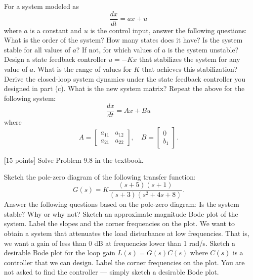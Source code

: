 \documentclass{ee122_pset}
\author{\rule{3cm}{0.4pt}} %
\begin{document}
For a system modeled as 
\[ \frac{dx}{dt} = ax + u \]
where $a$ is a constant and $u$ is the control input, answer the following questions:
\problempart [5 points] What is the order of the system? How many states does it have?
\problempart [5 points] Is the system stable for all values of $a$? If not, for which values of $a$ is the system unstable?
\problempart [10 points] Design a state feedback controller $u = -Kx$ that stabilizes the system for any value of $a$. What is the range of values for $K$ that achieves this stabilization?
\problempart [5 points] Derive the closed-loop system dynamics under the state feedback controller you designed in part (c). What is the new system matrix?
\problempart [25 points] Repeat the above for the following system:
\[ \frac{dx}{dt} = Ax + Bu \]
where
\[
A = \begin{bmatrix}
a_{11} & a_{12} \\
a_{21} & a_{22}
\end{bmatrix}, \quad B = \begin{bmatrix}    0 \\ b_1 \end{bmatrix}.
\]

 [15 points] Solve Problem 9.8 in the textbook. 

\problempart [5 points] Sketch the pole-zero diagram of the following transfer function:
\[
G(s) = K \frac{(s+5)(s+1)}{(s+3)(s^2 + 4s + 8)}.
\]
Answer the following questions based on the pole-zero diagram:
\problempart [5 points] Is the system stable? Why or why not?
\problempart [10 points] Sketch an approximate magnitude Bode plot of the system. Label the slopes and the corner frequencies on the plot.
\problempart [15 points] We want to obtain a system that attenuates the load disturbance at low frequencies. That is, we want a gain of less than 0 dB at frequencies lower than 1 rad/s. Sketch a desirable Bode plot for the loop gain $L(s) = G(s)C(s)$ where $C(s)$ is a controller that we can design. Label the corner frequencies on the plot.
You are not asked to find the controller --- simply sketch a desirable Bode plot.
\end{document}

